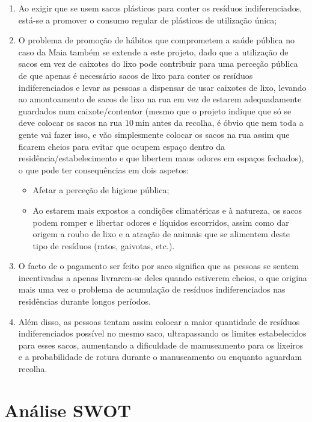 \documentclass[11pt, a4paper, oneside]{book}
\begin{document}
\begin{enumerate}
    \item Ao exigir que se usem sacos plásticos para conter os resíduos indiferenciados, está-se a promover o consumo regular de plásticos de utilização única;
    \item O problema de promoção de hábitos que comprometem a saúde pública no caso da Maia também se extende a este projeto, dado que a utilização de sacos em vez de caixotes do lixo pode contribuir para uma perceção pública de que apenas é necessário sacos de lixo para conter os resíduos indiferenciados e levar as pessoas a dispensar de usar caixotes de lixo, levando ao amontoamento de sacos de lixo na rua em vez de estarem adequadamente guardados num caixote/contentor (mesmo que o projeto indique que só se deve colocar os sacos na rua $\SI{10}{\minute}$ antes da recolha, é óbvio que nem toda a gente vai fazer isso, e vão simplesmente colocar os sacos na rua assim que ficarem cheios para evitar que ocupem espaço dentro da residência/estabelecimento e que libertem maus odores em espaços fechados), o que pode ter consequências em dois aspetos:
    \begin{itemize}
        \item Afetar a perceção de higiene pública;
        \item Ao estarem mais expostos a condições climatéricas e à natureza, os sacos podem romper e libertar odores e líquidos escorridos, assim como dar origem a roubo de lixo e a atração de animais que se alimentem deste tipo de resíduos (ratos, gaivotas, etc.).
    \end{itemize}
    \item O facto de o pagamento ser feito por saco significa que as pessoas se sentem incentivadas a apenas livrarem-se deles quando estiverem cheios, o que origina mais uma vez o problema de acumulação de resíduos indiferenciados nas residências durante longos períodos.
    \item Além disso, as pessoas tentam assim colocar a maior quantidade de resíduos indiferenciados possível no mesmo saco, ultrapassando os limites estabelecidos para esses sacos, aumentando a dificuldade de manuseamento para os lixeiros e a probabilidade de rotura durante o manuseamento ou enquanto aguardam recolha.
\end{enumerate}

\newpage

\section{Análise SWOT}
\end{document}
